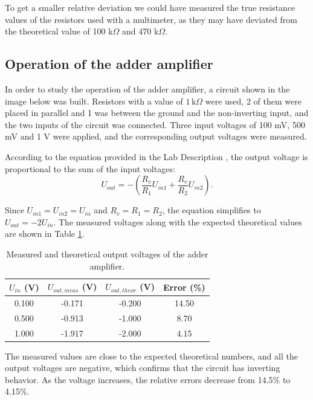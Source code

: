 \documentclass[12pt]{article}
\begin{document}
To get a smaller relative deviation we could have measured the true resistance values of the resistors used with a multimeter, as they may have deviated from the theoretical value of 100 k$\Omega$ and 470 k$\Omega$.

\subsection{Operation of the adder amplifier}

In order to study the operation of the adder amplifier, a circuit shown in the image below was built. Resistors with a value of $1\,\mathrm{k}\Omega$ were used,  2 of them were placed in parallel and 1 was between the ground and the non-inverting input, and the two inputs of the circuit was connected. Three input voltages of 100 mV, 500 mV and 1 V were applied, and the corresponding output voltages were measured.

According to the equation provided in the Lab Description \cite{opamp_manual}, the output voltage is proportional to the sum of the input voltages:
\begin{equation}
    U_{out} = -\left(\frac{R_v}{R_1}U_{in1} + \frac{R_v}{R_2}U_{in2}\right).
\end{equation}


Since $U_{in1} = U_{in2} = U_{in}$ and $R_v = R_1 = R_2$, the equation simplifies to $U_{out} = -2U_{in}$.
The measured voltages along with the expected theoretical values are shown in Table \ref{tab:adder}. 

\begin{table}[H]
    \centering
    \caption{Measured and theoretical output voltages of the adder amplifier.}
    \label{tab:adder}
    \begin{tabular}{cccc}
        \toprule
        $U_{in}$ (V) & $U_{out,meas}$ (V) &
        $U_{out,theor}$ (V) & Error (\%) \\
        \midrule
        0.100 & -0.171 & -0.200 & 14.50 \\
        0.500 & -0.913 & -1.000 & 8.70 \\
        1.000 & -1.917 & -2.000 & 4.15 \\
        \bottomrule
    \end{tabular}
\end{table}

The measured values are close to the expected theoretical numbers, and all the output voltages are negative, which confirms that the circuit has inverting behavior. As the voltage increases, the relative errors decrease from 14.5\% to 4.15\%. 
\end{document}
